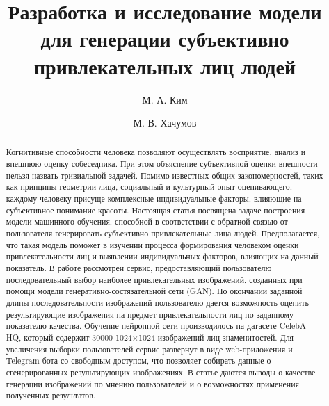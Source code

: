 \documentclass[60x84/16,8pt]{ittmm}
\begin{document}

\title{Разработка и исследование модели для генерации субъективно привлекательных лиц людей}

\author[1]{М. А. Ким}
\author[1]{М. В. Хачумов}

\address[1]{Кафедра математического моделирования и искусственного интеллекта,\\
  Российский университет дружбы народов,\\
  ул. Миклухо-Маклая, д.6, Москва, Россия, 117198}


\begin{abstract}
Когнитивные способности человека позволяют осуществлять восприятие, анализ и внешнюю оценку собеседника.
При этом объяснение субъективной оценки внешности нельзя назвать тривиальной задачей.
Помимо известных общих закономерностей, таких как принципы геометрии лица, социальный и культурный опыт оценивающего,
каждому человеку присуще комплексные индивидуальные факторы, влияющие на субъективное понимание красоты.
Настоящая статья посвящена задаче построения модели машинного обучения, способной в соответствии с обратной
связью от пользователя генерировать субъективно привлекательные лица людей. Предполагается, что такая модель
поможет в изучении процесса формирования человеком оценки привлекательности лиц и выявлении индивидуальных факторов,
влияющих на данный показатель. В работе рассмотрен сервис, предоставляющий пользователю последовательный выбор наиболее привлекательных изображений,
созданных при помощи модели генеративно-состязательной сети (GAN). По окончании заданной длины последовательности изображений
пользователю дается возможность оценить результирующие изображения на предмет привлекательности лиц по заданному показателю качества.
Обучение нейронной сети производилось на датасете CelebA-HQ, который содержит 30000 1024×1024 изображений лиц знаменитостей.
Для увеличения выборки пользователей сервис развернут в виде web-приложения и Telegram бота со свободным доступом, что позволяет
собирать данные о сгенерированных результирующих изображениях. В статье даются выводы о качестве генерации изображений по мнению
пользователей и о возможностях применения полученных результатов.
\end{abstract}

\end{document}
